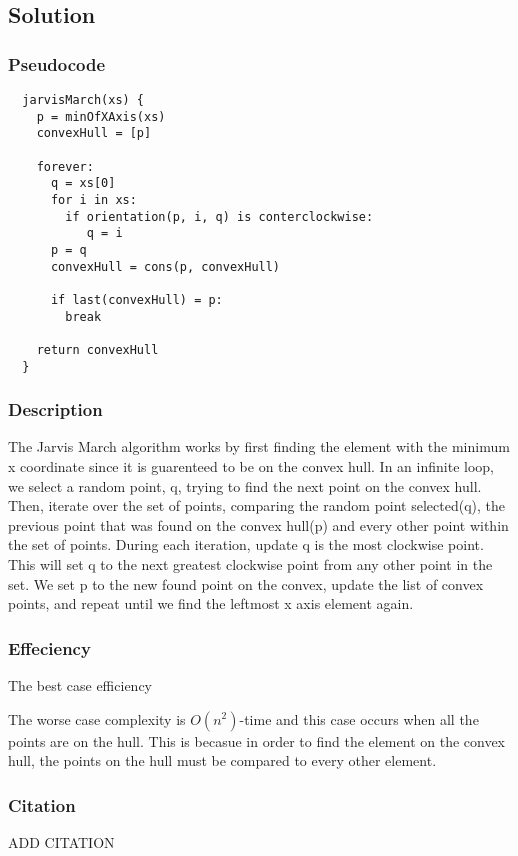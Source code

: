 \subsection*{Solution}
\subsubsection*{Pseudocode}
\begin{verbatim}
  jarvisMarch(xs) {
    p = minOfXAxis(xs)
    convexHull = [p]

    forever:
      q = xs[0]
      for i in xs:
        if orientation(p, i, q) is conterclockwise:
           q = i
      p = q
      convexHull = cons(p, convexHull)

      if last(convexHull) = p:
        break

    return convexHull
  }
\end{verbatim}

\subsubsection*{Description}
The Jarvis March algorithm works by first finding the element with the minimum x coordinate since it is guarenteed to be on the convex hull. In an infinite loop, we select a random point, q, trying to find the next point on the convex hull. Then, iterate over the set of points, comparing the random point selected(q), the previous point that was found on the convex hull(p) and every other point within the set of points. During each iteration, update q is the most clockwise point. This will set q to the next greatest clockwise point from any other point in the set. We set p to the new found point on the convex, update the list of convex points, and repeat until we find the leftmost x axis element again.

\subsubsection*{Effeciency}

The best case efficiency

The worse case complexity is $O(n^2)$-time and this case occurs when all the points are on the hull. This is becasue in order to find the element on the convex hull, the points on the hull must be compared to every other element.

\subsubsection*{Citation}

ADD CITATION

